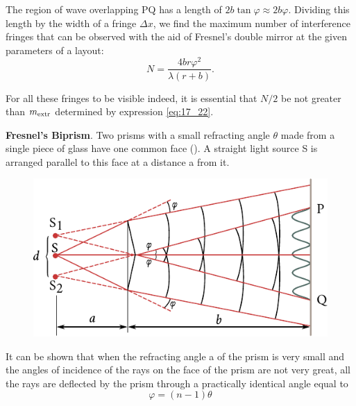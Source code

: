 \noindent
The region of wave overlapping PQ has a length of $2b\tan\varphi\approx 2b\varphi$.
Dividing this length by the width of a fringe $\Delta{x}$, we find the maximum number of interference fringes that can be observed with the
aid of Fresnel's double mirror at the given parameters of a layout:
\begin{equation}\label{eq:17_29}
    N = \frac{4 b r \varphi^2}{\lambda (r + b)}.
\end{equation}

\noindent
For all these fringes to be visible indeed, it is essential that $N/2$ be not greater than $m_{\text{extr}}$ determined by expression \eqref{eq:17_22}.

\textbf{Fresnel's Biprism}.
Two prisms with a small refracting angle $\theta$ made from a single piece of glass have one common face ().
A straight light source S is arranged parallel to this face at a distance a from it.

\begin{figure}[t]
	\begin{center}
		\includegraphics[scale=0.98]{figures/ch_17/fig_17_9.pdf}
		\caption[]{}
		\label{fig:17_9}
	\end{center}
	\vspace{-0.9cm}
\end{figure}

It can be shown that when the refracting angle a of the prism is very small and the angles of incidence of the rays on the face of the prism are not very great, all the rays are deflected by the prism through a practically identical angle equal to
\begin{equation*}
    \varphi = (n - 1) \theta
\end{equation*}

